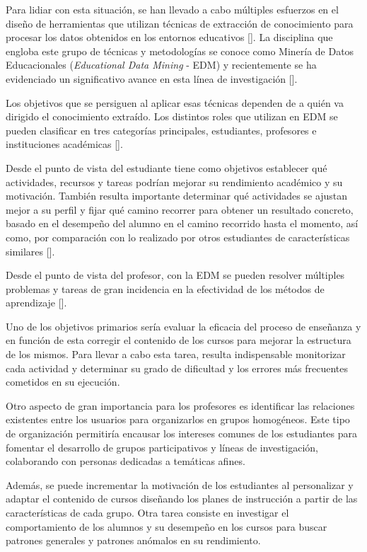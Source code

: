 Para lidiar con esta situación, se han llevado a cabo múltiples esfuerzos en el diseño de herramientas que utilizan técnicas de extracción de conocimiento para procesar los datos obtenidos en los entornos educativos [\cite{Sebastian}]. La disciplina que engloba este grupo de técnicas y metodologías se conoce como Minería de Datos Educacionales (\textit{Educational Data Mining} - EDM) y recientemente se ha evidenciado un significativo avance en esta línea de investigación [\cite{Vasile,Dominik}].  


Los objetivos que se persiguen al aplicar esas técnicas dependen de a quién va dirigido el conocimiento extraído. Los distintos roles que utilizan en EDM se pueden clasificar en tres categorías principales, estudiantes, profesores e instituciones académicas [\cite{Sebastian}].  


Desde el punto de vista del estudiante tiene como objetivos establecer qué actividades, recursos y tareas podrían mejorar su rendimiento académico y su motivación. También resulta importante determinar qué actividades se ajustan mejor a su perfil y fijar qué camino recorrer para obtener un resultado concreto, basado en el desempeño del alumno en el camino recorrido hasta el momento, así como, por comparación con lo realizado por otros estudiantes
de características similares [\cite{Sebastian}].  


Desde el punto de vista del profesor, con la EDM se pueden resolver múltiples problemas y tareas de gran incidencia en la efectividad de los métodos de aprendizaje [\cite{Sebastian}].  


Uno de los objetivos primarios sería evaluar la eficacia del proceso de enseñanza y en función de esta corregir el contenido de los cursos para mejorar la estructura de los mismos. Para llevar a cabo esta tarea, resulta indispensable monitorizar cada actividad y determinar su grado de dificultad y los errores más frecuentes cometidos en su ejecución.  


Otro aspecto de gran importancia para los profesores es identificar las relaciones existentes entre los usuarios para organizarlos en grupos homogéneos. Este tipo de organización permitiría encausar los intereses comunes de los estudiantes para fomentar el desarrollo de grupos participativos y líneas de investigación, colaborando con personas dedicadas a temáticas afines.  


Además, se puede incrementar la motivación de los estudiantes al personalizar y adaptar el contenido de cursos diseñando los planes de instrucción a partir de las características de cada grupo. Otra tarea consiste en investigar el comportamiento de los alumnos y su desempeño en los cursos para buscar patrones generales y patrones anómalos en su rendimiento.  


